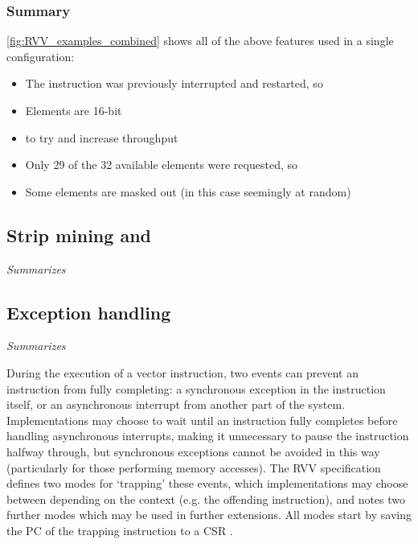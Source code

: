 \subsubsection{Summary}
\cref{fig:RVV_examples_combined} shows all of the above features used in a single configuration:
\begin{itemize}
    \item The instruction was previously interrupted and restarted, so 
    \item Elements are 16-bit
    \item {} to try and increase throughput
    \item Only 29 of the 32 available elements were requested, so 
    \item Some elements are masked out (in this case seemingly at random)
\end{itemize}

\pagebreak
\subsection{Strip mining and }
\emph{Summarizes \cite[Section 6]{RISCVVectorExtension2021}}

\pagebreak
\subsection{Exception handling}
\emph{Summarizes \cite[Section 17]{RISCVVectorExtension2021}}

During the execution of a vector instruction, two events can prevent an instruction from fully completing: a synchronous exception in the instruction itself, or an asynchronous interrupt from another part of the system.
Implementations may choose to wait until an instruction fully completes before handling asynchronous interrupts, making it unnecessary to pause the instruction halfway through, but synchronous exceptions cannot be avoided in this way (particularly for those performing memory accesses).
The RVV specification defines two modes for `trapping' these events, which implementations may choose between depending on the context (e.g. the offending instruction), and notes two further modes which may be used in further extensions.
All modes start by saving the PC of the trapping instruction to a CSR .

